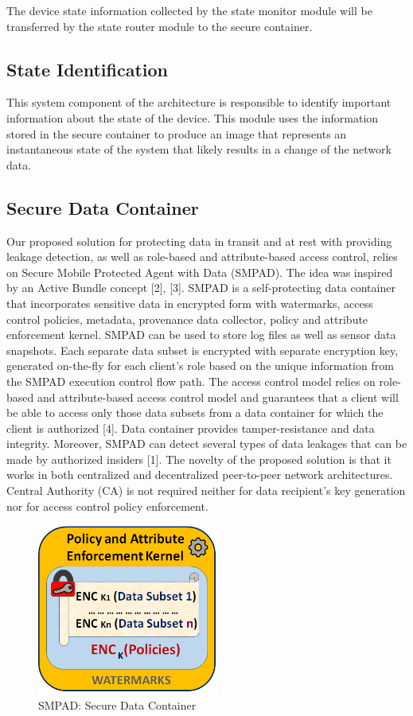 \documentclass[conference]{IEEEtran}
\begin{document}
The device state information collected by the state monitor module will be transferred by the state router module to the secure container. 


\subsection{State Identification}
This system component of the architecture is responsible to identify important information about the state of the device. This module uses the information stored in the secure container to produce an image that represents an instantaneous state of the system that likely results in a change of the network data. 

\subsection{Secure Data Container}
Our proposed solution for protecting data in transit and at rest with providing leakage detection, as well as role-based and attribute-based access control, relies on Secure Mobile Protected Agent with Data (SMPAD). The idea was inspired by an Active Bundle concept [2], [3]. SMPAD is a self-protecting data container that incorporates sensitive data in encrypted form with watermarks, access control policies, metadata, provenance data collector, policy and attribute enforcement kernel. SMPAD can be used to store log files as well as sensor data snapshots. Each separate data subset is encrypted with separate encryption key, generated on-the-fly for each client’s role based on the unique information from the SMPAD execution control flow path. The access control model relies on role-based and attribute-based access control model and guarantees that a client will be able to access only those data subsets from a data container for which the client is authorized [4]. Data container provides tamper-resistance and data integrity. Moreover, SMPAD can detect several types of data leakages that can be made by authorized insiders [1]. The novelty of the proposed solution is that it works in both centralized and decentralized peer-to-peer network architectures. Central Authority (CA) is not required neither for data recipient’s key generation nor for access control policy enforcement.

\begin{figure}[htbp]
\centering
\centerline{\includegraphics [width=6cm] {SMPAD-RelOK.png}}
\caption{SMPAD: Secure Data Container}
\label{sdc}
\end{figure}
\end{document}
